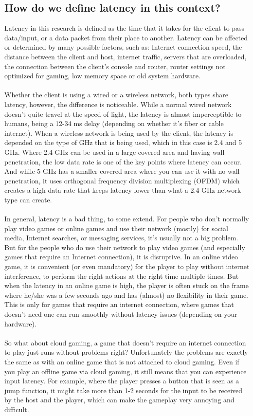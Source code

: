 \subsection{How do we define latency in this context?}
Latency in this research is defined as the time that it takes for the client to pass data/input, or a data packet from their place to another. Latency can be affected or determined by many possible factors, such as: Internet connection speed, the distance between the client and host, internet traffic, servers that are overloaded, the connection between the client's console and router, router settings not optimized for gaming, low memory space or old system hardware.\\\\
Whether the client is using a wired or a wireless network, both types share latency, however, the difference is noticeable. While a normal wired network doesn't quite travel at the speed of light, the latency is almost imperceptible to humans, being a 12-34 ms delay (depending on whether it's fiber or cable internet). When a wireless network is being used by the client, the latency is depended on the type of GHz that is being used, which in this case is 2.4 and 5 GHz. Where 2.4 GHz can be used in a large covered area and having wall penetration, the low data rate is one of the key points where latency can occur. And while 5 GHz has a smaller covered area where you can use it with no wall penetration, it uses orthogonal frequency division multiplexing (OFDM) which creates a high data rate that keeps latency lower than what a 2.4 GHz network type can create.\\\\
In general, latency is a bad thing, to some extend. For people who don't normally play video games or online games and use their network (mostly) for social media, Internet searches, or messaging services, it's usually not a big problem. But for the people who do use their network to play video games (and especially games that require an Internet connection), it is disruptive. In an online video game, it is convenient (or even mandatory) for the player to play without internet interference, to perform the right actions at the right time multiple times. But when the latency in an online game is high, the player is often stuck on the frame where he/she was a few seconds ago and has (almost) no flexibility in their game. This is only for games that require an internet connection, where games that doesn't need one can run smoothly without latency issues (depending on your hardware).\\\\
So what about cloud gaming, a game that doesn't require an internet connection to play just runs without problems right? Unfortunately the problems are exactly the same as with an online game that is not attached to cloud gaming. Even if you play an offline game via cloud gaming, it still means that you can experience input latency. For example, where the player presses a button that is seen as a jump function, it might take more than 1-2 seconds for the input to be received by the host and the player, which can make the gameplay very annoying and difficult.
